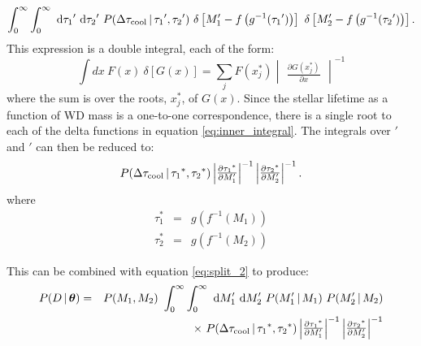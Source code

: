 \documentclass[12pt,preprint]{hackaastex}
\begin{document}
\begin{equation}
\int_0^{\infty} \int_0^{\infty} ~\der \ta' ~\der \tb'  ~P(\Delta \tauc \given \ta', \tb') ~\delta \left[ M_1' - f \left( g^{-1}(\ta') \right) \right] ~\delta \left[ M_2' - f \left( g^{-1}(\tb') \right) \right]. \label{eq:inner_integral}
\end{equation}
This expression is a double integral, each of the form:
\begin{equation}
\int dx ~F(x) ~\delta \left[ G(x) \right] = \sum_j F(x_j^*) \begin{vmatrix} \frac{\partial G(x_j^*)}{ \partial x} \end{vmatrix} ^{-1}
\end{equation}
where the sum is over the roots, $x_j^*$, of $G(x)$. Since the stellar lifetime as a function of WD mass is a one-to-one correspondence, there is a single root to each of the delta functions in equation \ref{eq:inner_integral}. The integrals over \ta$'$ and \tb$'$ can then be reduced to:
\begin{equation}
P (\Delta \tauc \given \ta^*, \tb^* )  \begin{vmatrix} \frac{\partial \ta^*}{\partial M_1'} \end{vmatrix}^{-1} \begin{vmatrix} \frac{\partial \tb^*}{\partial M_2'} \end{vmatrix}^{-1} .
\end{equation}
where
\begin{eqnarray}
\tau_1^* &=& g\left( f^{-1}(M_1) \right) \label{eq:t1} \\
\tau_2^* &=& g\left( f^{-1}(M_2) \right) \label{eq:t2}
\end{eqnarray}


This can be combined with equation \ref{eq:split_2} to produce:
\begin{eqnarray}
P(D \given \bs{\theta}) &=& P(M_1, M_2) ~\int_0^{\infty}\int_0^{\infty} ~\der M_1' ~\der M_2' ~P(M_1' \given M_1) ~P(M_2' \given M_2) \nonumber \\
& & \times ~P(\Delta \tauc \given \ta^*, \tb^* ) \begin{vmatrix} \frac{\partial \ta^*}{\partial M_1'} \end{vmatrix}^{-1}  \begin{vmatrix} \frac{\partial \tb^*}{\partial M_2'} \end{vmatrix}^{-1} 
\end{eqnarray}
\end{document}
